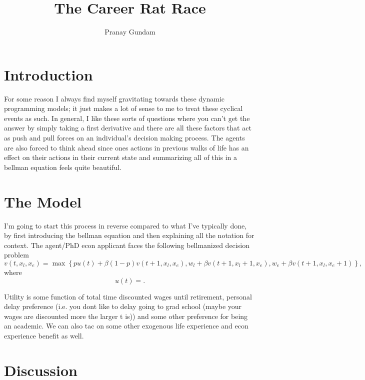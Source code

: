 \documentclass[11pt,english]{article}
\title{\textbf{The Career Rat Race}}
\author{Pranay Gundam}
\begin{document}
\maketitle


\section*{Introduction}

For some reason I always find myself gravitating towards these dynamic programming models; it just makes a lot of sense to me to treat these cyclical events as such.  In general, I like these sorts of questions where you can't get the answer by simply taking a first derivative and there are all these factors that act as push and pull forces on an individual's decision making process. The agents are also forced to think ahead since ones actions in previous walks of life has an effect on their actions in their current state and summarizing all of this in a bellman equation feels quite beautiful.

\section*{The Model}

I'm going to start this process in reverse compared to what I've typically done, by first introducing the bellman equation and then explaining all the notation for context. The agent/PhD econ applicant faces the following bellmanized decision problem $$v(t, x_{l}, x_{e}) = \max\left\{p  u(t) + \beta(1-p)v(t+1, x_{l}, x_{e}), w_{l} + \beta v(t+1, x_{l}+1, x_{e}), w_{e} + \beta v(t+1, x_{l}, x_{e}+1)\right\},$$ where $$u(t) = .$$

\noindent Utility is some function of total time discounted wages until retirement, personal delay preference (i.e. you dont like to delay going to grad school (maybe your wages are discounted more the larger t is)) and some other preference for being an academic. We can also tac on some other exogenous life experience and econ experience benefit as well.

\section*{Discussion}
\end{document}
